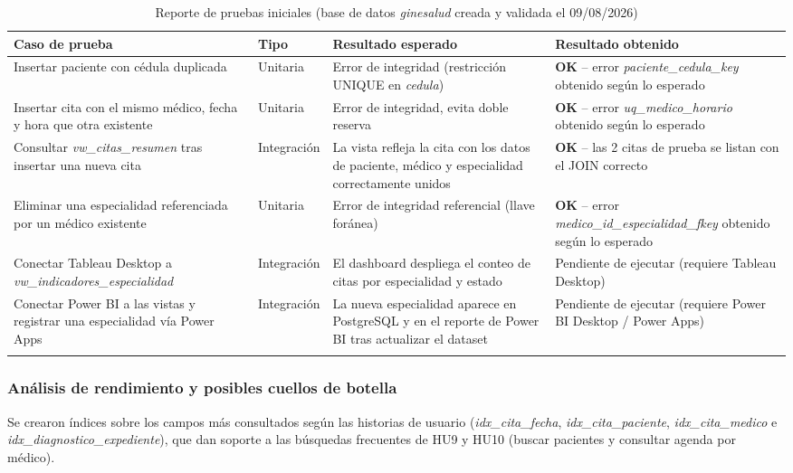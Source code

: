 \documentclass[12pt,letterpaper]{article}
\begin{document}
\begin{xltabular}{\textwidth}{|X|>{\centering\arraybackslash}p{1.6cm}|X|X|}
\hline
{}
\textbf{Caso de prueba} & \textbf{Tipo} & \textbf{Resultado esperado} & \textbf{Resultado obtenido} \\
\hline
\endhead
Insertar paciente con cédula duplicada & Unitaria & Error de integridad (restricción UNIQUE en \textit{cedula}) & \textbf{OK} -- error \textit{paciente\_cedula\_key} obtenido según lo esperado \\
\hline
Insertar cita con el mismo médico, fecha y hora que otra existente & Unitaria & Error de integridad, evita doble reserva & \textbf{OK} -- error \textit{uq\_medico\_horario} obtenido según lo esperado \\
\hline
Consultar \textit{vw\_citas\_resumen} tras insertar una nueva cita & Integración & La vista refleja la cita con los datos de paciente, médico y especialidad correctamente unidos & \textbf{OK} -- las 2 citas de prueba se listan con el JOIN correcto \\
\hline
Eliminar una especialidad referenciada por un médico existente & Unitaria & Error de integridad referencial (llave foránea) & \textbf{OK} -- error \textit{medico\_id\_especialidad\_fkey} obtenido según lo esperado \\
\hline
Conectar Tableau Desktop a \textit{vw\_indicadores\_especialidad} & Integración & El dashboard despliega el conteo de citas por especialidad y estado & Pendiente de ejecutar (requiere Tableau Desktop) \\
\hline
Conectar Power BI a las vistas y registrar una especialidad vía Power Apps & Integración & La nueva especialidad aparece en PostgreSQL y en el reporte de Power BI tras actualizar el dataset & Pendiente de ejecutar (requiere Power BI Desktop / Power Apps) \\
\hline
\caption{Reporte de pruebas iniciales (base de datos \textit{ginesalud} creada y validada el 09/08/2026)}
\end{xltabular}

\subsubsection*{Análisis de rendimiento y posibles cuellos de botella}

Se crearon índices sobre los campos más consultados según las historias de usuario
(\textit{idx\_cita\_fecha}, \textit{idx\_cita\_paciente}, \textit{idx\_cita\_medico} e
\textit{idx\_diagnostico\_expediente}), que dan soporte a las búsquedas frecuentes de HU9 y
HU10 (buscar pacientes y consultar agenda por médico).
\end{document}

